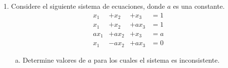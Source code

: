 \documentclass[12pt]{article}
\newenvironment{solucion}
{\begin{mdframed}[backgroundcolor=black!10]
		{\bf Solución:}\\
	}
	{
	\end{mdframed}
}
\newenvironment{preguntas}
{\begin{enumerate}\itemsep12pt
	}
	{
	\end{enumerate}
}
\begin{document}
\begin{preguntas}
\begin{solucion}
En primer lugar, notemos que dada las dimensiones de los vectores, la matriz $A$ es de $2 \times 2$. Luego,
		$$A = \begin{bmatrix}
		\alpha & \beta \\
		\gamma &\delta
		\end{bmatrix}$$
		Reemplazando,
		$$A\begin{bmatrix}
		3\\
		2
		\end{bmatrix}=\begin{bmatrix}
		2\\
		1
		\end{bmatrix} \Longrightarrow 
		\begin{bmatrix}
		\alpha & \beta \\
		\gamma &\delta
		\end{bmatrix}
		\begin{bmatrix}
			3\\
			2
		\end{bmatrix}=\begin{bmatrix}
			2\\
			1
		\end{bmatrix} \Longrightarrow
		\begin{array}{rc}
		3\alpha + 2\beta & = 2\\
		3\gamma + 2 \delta & = 1
		\end{array} \Longrightarrow
		\begin{array}{rc}
		3\alpha & = 2 - 2\beta\\
		3\gamma & = 1 - 2 \delta
		\end{array}$$
		Con lo que
		$$\alpha = \dfrac{2}{3} - \dfrac{2\beta}{3}$$
		$$\gamma = \dfrac{1}{3} - \dfrac{2\delta}{3}$$
		Finalmente,
		$$A = \begin{bmatrix}
		\frac{2}{3} - \frac{2\beta}{3} & \beta \\
		\frac{1}{3} - \frac{2\delta}{3} &\delta
		\end{bmatrix}$$
\end{solucion}
\item Considere el siguiente sistema de ecuaciones, donde $a$ es una constante.
  $$\begin{array}{llll}
   x_1&+x_2&+x_3&=1 \\
    x_1&+x_2&+ax_3&=1 \\
     ax_1&+ax_2&+x_3&=a\\
      x_1&-ax_2&+ax_3&=0  
  \end{array}$$
\begin{enumerate}[a)]
\item Determine valores de $a$ para los cuales el sistema es inconsistente.

\end{enumerate}
\end{preguntas}
\end{document}
